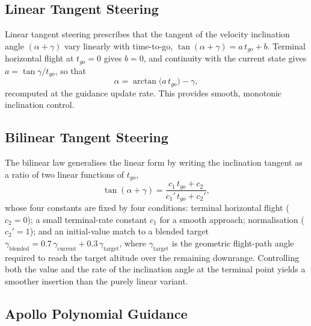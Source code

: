 \subsection{Linear Tangent Steering}
\label{ssec:lts}

Linear tangent steering prescribes that the tangent of the velocity inclination
angle $(\alpha+\gamma)$ vary linearly with time-to-go,
$\tan(\alpha+\gamma)=a\,t_{go}+b$. Terminal horizontal flight at $t_{go}=0$ gives
$b=0$, and continuity with the current state gives $a=\tan\gamma/t_{go}$, so that
\begin{equation}
  \alpha = \arctan\!\bigl(a\,t_{go}\bigr) - \gamma,
  \label{eq:lts_alpha}
\end{equation}
recomputed at the guidance update rate. This provides smooth, monotonic
inclination control.

\subsection{Bilinear Tangent Steering}
\label{ssec:bts}

The bilinear law generalises the linear form by writing the inclination tangent
as a ratio of two linear functions of $t_{go}$,
\begin{equation}
  \tan(\alpha+\gamma)
    = \frac{c_1\,t_{go} + c_2}{c_1'\,t_{go} + c_2'},
  \label{eq:bts}
\end{equation}
whose four constants are fixed by four conditions: terminal horizontal flight
($c_2=0$); a small terminal-rate constant $c_1$ for a smooth approach;
normalisation ($c_2'=1$); and an initial-value match to a blended target
$\gamma_{\mathrm{blended}}=0.7\,\gamma_{\mathrm{current}}+0.3\,\gamma_{\mathrm{target}}$,
where $\gamma_{\mathrm{target}}$ is the geometric flight-path angle required to
reach the target altitude over the remaining downrange. Controlling both the
value and the rate of the inclination angle at the terminal point yields a
smoother insertion than the purely linear variant.

\subsection{Apollo Polynomial Guidance}
\label{ssec:apollo}

